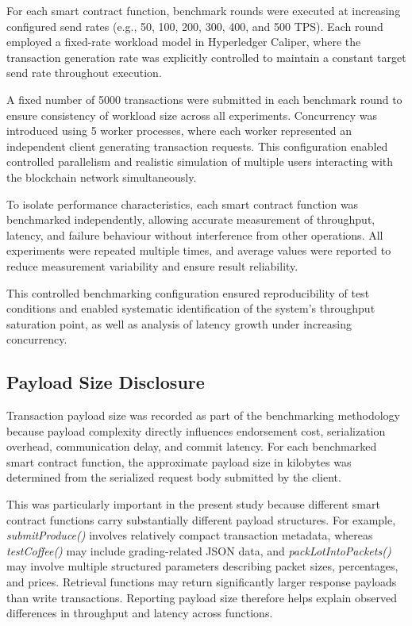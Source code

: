 \documentclass[12pt]{article}
\begin{document}
	For each smart contract function, benchmark rounds were executed at increasing configured send rates (e.g., 50, 100, 200, 300, 400, and 500 TPS). Each round employed a fixed-rate workload model in Hyperledger Caliper, where the transaction generation rate was explicitly controlled to maintain a constant target send rate throughout execution.
	
	A fixed number of 5000 transactions were submitted in each benchmark round to ensure consistency of workload size across all experiments. Concurrency was introduced using 5 worker processes, where each worker represented an independent client generating transaction requests. This configuration enabled controlled parallelism and realistic simulation of multiple users interacting with the blockchain network simultaneously.
	
	To isolate performance characteristics, each smart contract function was benchmarked independently, allowing accurate measurement of throughput, latency, and failure behaviour without interference from other operations. All experiments were repeated multiple times, and average values were reported to reduce measurement variability and ensure result reliability.
	
	This controlled benchmarking configuration ensured reproducibility of test conditions and enabled systematic identification of the system’s throughput saturation point, as well as analysis of latency growth under increasing concurrency.
	\subsection{Payload Size Disclosure}
	
	Transaction payload size was recorded as part of the benchmarking methodology because payload complexity directly influences endorsement cost, serialization overhead, communication delay, and commit latency. For each benchmarked smart contract function, the approximate payload size in kilobytes was determined from the serialized request body submitted by the client.
	
	This was particularly important in the present study because different smart contract functions carry substantially different payload structures. For example, \textit{submitProduce()} involves relatively compact transaction metadata, whereas \textit{testCoffee()} may include grading-related JSON data, and \textit{packLotIntoPackets()} may involve multiple structured parameters describing packet sizes, percentages, and prices. Retrieval functions may return significantly larger response payloads than write transactions. Reporting payload size therefore helps explain observed differences in throughput and latency across functions. 
	
\end{document}
